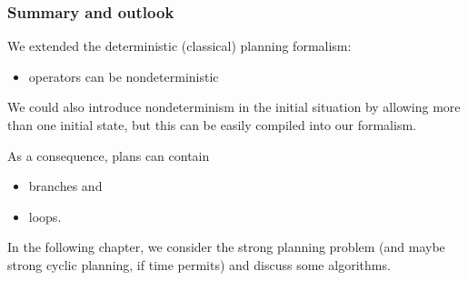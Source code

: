 \documentclass{gkibeamer}
\begin{document}

\begin{frame}
  \frametitle{Summary and outlook}
  
  We extended the deterministic (\alert{classical}) planning formalism:
  \begin{itemize}
  \item \alert{operators} can be nondeterministic
  \end{itemize}
   We could also introduce nondeterminism in the
  initial situation by allowing more than one initial state, but this
  can be easily compiled into our formalism.

  \bigskip

  As a consequence, \alert{plans} can contain
  \begin{itemize}
  \item \alert{branches} and
  \item \alert{loops}.
  \end{itemize}

  \bigskip

  In the following chapter, we consider the \alert{strong planning}
  problem (and maybe strong cyclic planning, if time permits) and
  discuss some algorithms.
\end{frame}
\end{document}
